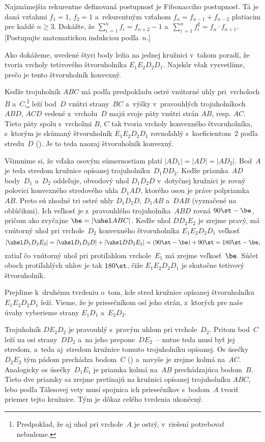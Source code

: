 {Najznámejšia rekurentne definovaná postupnosť je
Fibonacciho postupnosť. Tá je daná vzťahmi $f_1 = 1$, $f_2 = 1$
a~rekurentným vzťahom $f_n = f_{n-1}+f_{n-2}$ platiacim pre každé $n \ge 3$.
Dokážte, že $\sum_{i~= 1}^{n} f_i = f_{n+2}-1$ a~$\sum_{i~= 1}^{n}
f_i^2 = f_n \cdot f_{n+1}$.
[Postupujte matematickou indukciou podľa~$n$.]
}

{%
Ako dokážeme, uvedené štyri body ležia na jednej kružnici
v~takom poradí, že tvoria vrcholy tetivového štvoruholníka $E_1E_2D_2D_1$.
Najskôr však vysvetlíme, prečo je tento štvoruholník konvexný.

Keďže trojuholník $ABC$ má podľa predpokladu ostré vnútorné uhly
pri~vrcholoch $B$ a~$C$,\footnote{Predpoklad, že aj uhol pri vrchole~$A$
je ostrý, v~riešení potrebovať nebudeme.} leží bod~$D$ vnútri
strany~$BC$ a~výšky v~pravouhlých trojuholníkoch $ABD$, $ACD$
vedené z~vrcholu~$D$ majú svoje päty vnútri strán $AB$, resp. $AC$.
Tieto päty spolu s~vrcholmi $B$, $C$ tak tvoria vrcholy
konvexného štvoruholníka, s~ktorým je skúmaný štvoruholník
$E_1E_2D_2D_1$ rovnoľahlý s~koeficientom~2 podľa stredu~$D$
(\obr). Je to teda naozaj štvoruholník konvexný.
%

Všimnime si, že vďaka osovým súmernostiam platí
$|AD_1|=|AD|=|AD_2|$. Bod~$A$ je teda stredom kružnice opísanej
trojuholníku~$D_1DD_2$. Keďže priamka~$AD$ body~$D_1$ a~$D_2$ oddeľuje,
obvodový uhol $D_1D_2D$ v~dotyčnej kružnici je rovný polovici
konvexného stredového uhla $D_1AD$, ktorého osou je práve
polpriamka~$AB$. Preto sú zhodné tri ostré uhly $D_1D_2D$, $D_1AB$
a~$DAB$ (vyznačené na  oblúčikmi). Ich veľkosť je
z~pravouhlého trojuholníka~$ABD$ rovná $90\st-\be$, pričom ako zvyčajne
$\be=|\uhel ABC|$. Keďže uhol $DD_2E_2$ je zrejme pravý, má
vnútorný uhol pri vrchole~$D_2$ konvexného štvoruholníka $E_1E_2D_2D_1$
veľkosť
$$
|\uhel D_1D_2E_2|=|\uhel D_1D_2D|+|\uhel DD_2E_2|=(90\st-\be)+90\st=180\st-\be,
$$
zatiaľ čo vnútorný uhol pri protiľahlom vrchole~$E_1$ má zrejme
veľkosť~$\be$. Súčet oboch protiľahlých uhlov je tak $180\st$, čiže
$E_1E_2D_2D_1$ je skutočne tetivový štvoruholník.

Prejdime k~druhému tvrdeniu o~tom, kde stred kružnice opísanej štvoruholníku
$E_1E_2D_2D_1$ leží. Vieme, že je priesečníkom osí jeho strán, z~ktorých
pre naše úvahy vyberieme strany $E_1D_1$ a~$E_2D_2$.

Trojuholník $DE_2D_2$ je pravouhlý s~pravým
uhlom pri vrchole~$D_2$. Pritom bod~$C$ leží na osi strany~$DD_2$
a~na jeho prepone~$DE_2$~-- nutne teda musí byť jej stredom, a~teda
aj~stredom kružnice tomuto trojuholníku opísanej. Os úsečky~$D_2E_2$ tým
pádom prechádza bodom~$C$ (\obr) a~navyše je zrejme kolmá na~$AC$.
Analogicky os úsečky~$D_1E_1$ je priamka kolmá na~$AB$
prechádzajúca bodom~$B$. Tieto dve priamky sa zrejme pretínajú na
kružnici opísanej trojuholníku $ABC$, lebo podľa Tálesovej vety
musí spojnica ich priesečníkov s~bodom~$A$ tvoriť priemer tejto kružnice.
Tým je dôkaz celého tvrdenia ukončený.
%


}
